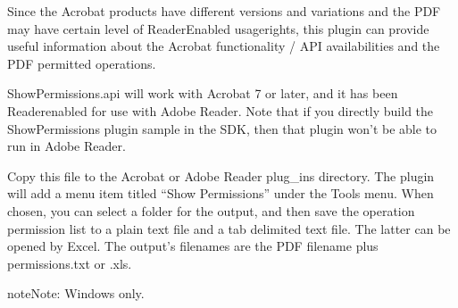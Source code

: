\documentclass[letterpaper,12pt,english,openany,oneside]{sphinxmanual}
\begin{document}
Since the Acrobat products have different versions and variations and the PDF may have certain level of Reader\sphinxhyphen{}Enabled usage\sphinxhyphen{}rights, this plugin can provide useful information about the Acrobat functionality / API availabilities and the PDF permitted operations.

ShowPermissions.api will work with Acrobat 7 or later, and it has been Reader\sphinxhyphen{}enabled for use with Adobe Reader. Note that if you directly build the ShowPermissions plugin sample in the SDK, then that plugin won’t be able to run in Adobe Reader.

\label{\detokenize{Samples_Tools:usage-1}}

Copy this file to the Acrobat or Adobe Reader plug\_ins directory. The plugin will add a menu item titled “Show Permissions” under the Tools menu. When chosen, you can select a folder for the output, and then save the operation permission list to a plain text file and a tab delimited text file. The latter can be opened by Excel. The output’s filenames are the PDF filename plus \sphinxhyphen{}permissions.txt or .xls.

\begin{sphinxadmonition}{note}{Note:}
Windows only.
\end{sphinxadmonition}



\renewcommand{\indexname}{Index}
\printindex
\end{document}
